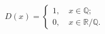 \documentclass[preview]{standalone}
\begin{document}
\begin{align*}
D(x)=\begin{cases} 1, \quad x \in \mathbb{Q}; \\0, \quad x \in  \mathbb{R} / \mathbb{Q}. \end{cases}
\end{align*}
\end{document}
